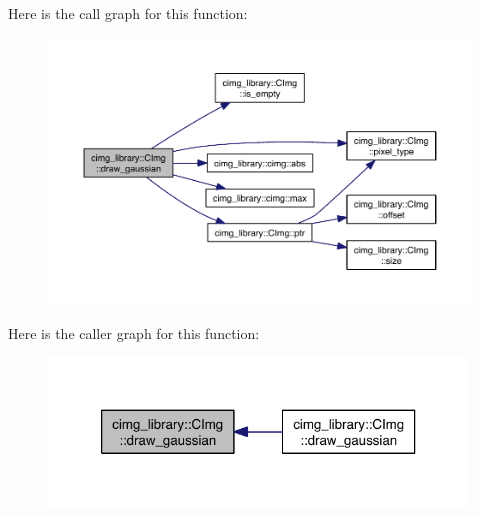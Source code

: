 Here is the call graph for this function\-:
\nopagebreak
\begin{figure}[H]
\begin{center}
\leavevmode
\includegraphics[width=350pt]{structcimg__library_1_1_c_img_ab5ef73b2bf38b55dbd20e1fa5e180391_cgraph}
\end{center}
\end{figure}




Here is the caller graph for this function\-:
\nopagebreak
\begin{figure}[H]
\begin{center}
\leavevmode
\includegraphics[width=316pt]{structcimg__library_1_1_c_img_ab5ef73b2bf38b55dbd20e1fa5e180391_icgraph}
\end{center}
\end{figure}


